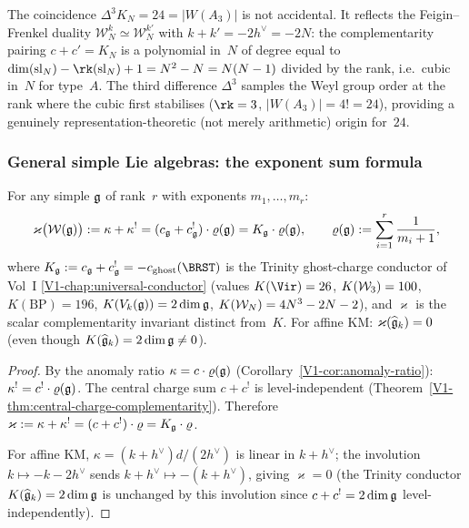 \begin{remark}
\label{rem:koszul-conductor-24-mechanism}
The coincidence $\Delta^3 K_N = 24 = |W(A_3)|$ is not accidental.
It reflects the Feigin--Frenkel duality $\mathcal{W}_N^k \simeq
\mathcal{W}_N^{k'}$ with $k + k' = -2h^\vee = -2N$: the
complementarity pairing $c + c' = K_N$ is a polynomial in~$N$
of degree equal to $\dim(\mathrm{sl}_N) - \rk(\mathrm{sl}_N)
+ 1 = N^2 - N = N(N-1)$ divided by the rank, i.e.~cubic in~$N$ for
type~$A$. The third difference $\Delta^3$ samples the Weyl group
order at the rank where the cubic first stabilises
($\rk = 3$, $|W(A_3)| = 4! = 24$), providing a genuinely
representation-theoretic (not merely arithmetic) origin for~$24$.
\end{remark}

\subsubsection{General simple Lie algebras: the exponent sum formula}

\begin{theorem}
For any simple $\mathfrak{g}$ of rank~$r$ with exponents $m_1, \ldots, m_r$:
\begin{equation}%
\varkappa\bigl(\mathcal{W}(\fg)\bigr) := \kappa + \kappa^!
= (c_{\fg} + c_{\fg}^!) \cdot \varrho(\fg)
= K_{\fg}\cdot\varrho(\fg),
\qquad
\varrho(\fg) := \sum_{i=1}^r \frac{1}{m_i + 1},
\end{equation}
where $K_{\fg} := c_{\fg} + c_{\fg}^! = -c_{\mathrm{ghost}}(\BRST)$ is
the Trinity ghost-charge conductor of Vol~I
\cref{V1-chap:universal-conductor} (values $K(\Vir) = 26$, $K(\mathcal{W}_3) = 100$,
$K(\mathrm{BP}) = 196$, $K(V_k(\mathfrak{g})) = 2\dim\mathfrak{g}$, $K(\mathcal{W}_N) = 4N^3-2N-2$),
and $\varkappa$ is the scalar complementarity invariant distinct from~$K$.
For affine KM: $\varkappa(\widehat{\mathfrak{g}}_k) = 0$ (even though $K(\widehat{\mathfrak{g}}_k) = 2\dim\mathfrak{g} \ne 0$).
\end{theorem}

\begin{proof}
By the anomaly ratio $\kappa = c \cdot \varrho(\mathfrak{g})$
(Corollary~\ref{V1-cor:anomaly-ratio}): $\kappa^! = c^! \cdot \varrho(\mathfrak{g})$.
The central charge sum $c + c^!$ is level-independent
(Theorem~\ref{V1-thm:central-charge-complementarity}).
Therefore $\varkappa := \kappa + \kappa^! = (c + c^!) \cdot \varrho = K_{\mathfrak{g}} \cdot \varrho$.

For affine KM, $\kappa = (k+h^\vee)d/(2h^\vee)$ is linear in
$k + h^\vee$; the involution $k \mapsto -k - 2h^\vee$ sends
$k + h^\vee \mapsto -(k + h^\vee)$, giving $\varkappa = 0$
(the Trinity conductor $K(\widehat{\mathfrak{g}}_k) = 2\dim\mathfrak{g}$ is unchanged by
this involution since $c + c^! = 2\dim\mathfrak{g}$ level-independently).
\end{proof}


